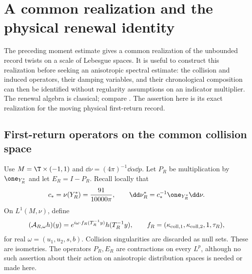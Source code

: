 \section{A common realization and the physical renewal identity}
\label{sec:common-renewal}
The preceding moment estimate gives a common realization of the
unbounded record twists on a scale of Lebesgue spaces. It is useful to
construct this realization before seeking an anisotropic spectral
estimate: the collision and induced operators, their damping variables,
and their chronological composition can then be identified without
regularity assumptions on an indicator multiplier. The renewal algebra
is classical; compare \cite{GouezelRenewal}. The assertion here is its
exact realization for the moving physical first-return record.

\subsection{First-return operators on the common collision space}
Use $M=\T\times(-1,1)$ and $\dd\nu=(4\pi)^{-1}\dd\alpha\dd p$.
Let $P_R$ be multiplication by $\one_{Y_R^*}$ and let $E_R=I-P_R$.
Recall locally that
\[
 c_* = \nu(Y_R^*)=\frac{91}{10000\pi},\qquad
 \dd\nu_R^*=c_*^{-1}\one_{Y_R^*}\dd\nu.
\]
On $L^1(M,\nu)$, define
\[
 (\mathcal A_{R,\omega}h)(y)
   =e^{i\omega\cdot f_R(T_R^{-1}y)}h(T_R^{-1}y),\qquad
 f_R=(\kappa_{{\rm coll},1},\kappa_{{\rm coll},2},1,\tau_R),
\]
for real $\omega=(u_1,u_2,s,b)$. Collision singularities are discarded
as null sets. These are isometries. The operators $P_R,E_R$ are
contractions on every $L^p$, although no such assertion about their
action on anisotropic distribution spaces is needed or made here.

